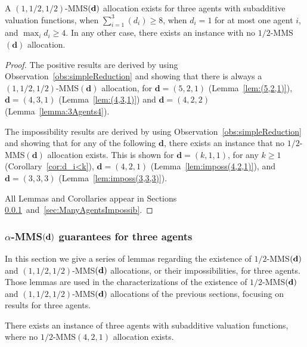 \begin{theorem}\label{thm:three-general-approximate}
    A $(1,1/2,1/2)$-MMS$(\bf d)$ allocation exists for three agents with subadditive valuation functions, when $\sum_{i=1}^3(d_i)\geq 8$, when $d_i=1$ for at most one agent $i$, and $\max_i d_i \geq 4$. In any other case, there exists an instance with no $1/2$-MMS$(\mathbf{d})$ allocation.
\end{theorem}

\begin{proof}
    The positive results are derived by using Observation~\ref{obs:simpleReduction} and showing that there is always a  $(1,1/2,1/2)$-MMS$(\mathbf{d})$ allocation, for $\mathbf{d}=(5,2,1)$ (Lemma~\ref{lem:(5,2,1)}), $\mathbf{d}=(4,3,1)$ (Lemma~\ref{lem:(4,3,1)}) and $\mathbf{d}=(4,2,2)$ (Lemma~\ref{lemma:3Agents4}). 
    
    The impossibility results are derived by using Observation~\ref{obs:simpleReduction} and showing that for any of the following $\mathbf{d}$, there exists an instance that no $1/2$-MMS$(\mathbf{d})$ allocation exists. This is shown for $\mathbf{d}=(k,1,1)$, for any $k\geq 1$ (Corollary~\ref{cor:d_i<k}), $\mathbf{d}=(4,2,1)$ (Lemma~\ref{lem:imposs(4,2,1)}), and $\mathbf{d}=(3,3,3)$ (Lemma~\ref{lem:imposs(3,3,3)}).

    All Lemmas and Corollaries appear in Sections \ref{sec:CharacterizationLemmas}~and~\ref{sec:ManyAgentsImpossib}.
    \end{proof}

\subsubsection{$\alpha$-MMS$(\bf d)$ guarantees for three agents}
\label{sec:CharacterizationLemmas}

In this section we give a series of lemmas regarding the existence of $1/2$-MMS$(\bf d)$ and $(1,1/2,1/2)$-MMS$(\bf d)$ allocations, or their impossibilities, for three agents. Those lemmas are used in the characterizations of the existence of $1/2$-MMS$(\bf d)$ and $(1,1/2,1/2)$-MMS$(\bf d)$ allocations of the previous sections, focusing on results for three agents.


    \begin{lemma}
\label{lem:imposs(4,2,1)}
There exists an instance of three agents with subadditive valuation functions, where no $1/2$-MMS$(4,2,1)$ allocation exists.
\end{lemma}

